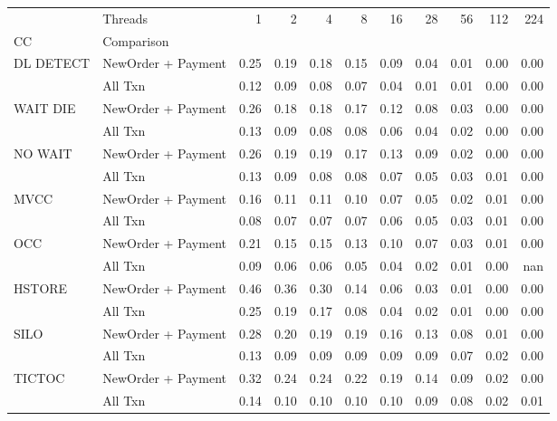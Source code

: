 \begin{tabular}{llrrrrrrrrr}
\toprule
       & Threads &  1   &  2   &  4   &  8   &  16  &  28  &  56  &  112 &  224 \\
CC & Comparison &      &      &      &      &      &      &      &      &      \\
\midrule
DL DETECT & NewOrder + Payment & 0.25 & 0.19 & 0.18 & 0.15 & 0.09 & 0.04 & 0.01 & 0.00 & 0.00 \\
       & All Txn & 0.12 & 0.09 & 0.08 & 0.07 & 0.04 & 0.01 & 0.01 & 0.00 & 0.00 \\
WAIT DIE & NewOrder + Payment & 0.26 & 0.18 & 0.18 & 0.17 & 0.12 & 0.08 & 0.03 & 0.00 & 0.00 \\
       & All Txn & 0.13 & 0.09 & 0.08 & 0.08 & 0.06 & 0.04 & 0.02 & 0.00 & 0.00 \\
NO WAIT & NewOrder + Payment & 0.26 & 0.19 & 0.19 & 0.17 & 0.13 & 0.09 & 0.02 & 0.00 & 0.00 \\
       & All Txn & 0.13 & 0.09 & 0.08 & 0.08 & 0.07 & 0.05 & 0.03 & 0.01 & 0.00 \\
MVCC & NewOrder + Payment & 0.16 & 0.11 & 0.11 & 0.10 & 0.07 & 0.05 & 0.02 & 0.01 & 0.00 \\
       & All Txn & 0.08 & 0.07 & 0.07 & 0.07 & 0.06 & 0.05 & 0.03 & 0.01 & 0.00 \\
OCC & NewOrder + Payment & 0.21 & 0.15 & 0.15 & 0.13 & 0.10 & 0.07 & 0.03 & 0.01 & 0.00 \\
       & All Txn & 0.09 & 0.06 & 0.06 & 0.05 & 0.04 & 0.02 & 0.01 & 0.00 &  nan \\
HSTORE & NewOrder + Payment & 0.46 & 0.36 & 0.30 & 0.14 & 0.06 & 0.03 & 0.01 & 0.00 & 0.00 \\
       & All Txn & 0.25 & 0.19 & 0.17 & 0.08 & 0.04 & 0.02 & 0.01 & 0.00 & 0.00 \\
SILO & NewOrder + Payment & 0.28 & 0.20 & 0.19 & 0.19 & 0.16 & 0.13 & 0.08 & 0.01 & 0.00 \\
       & All Txn & 0.13 & 0.09 & 0.09 & 0.09 & 0.09 & 0.09 & 0.07 & 0.02 & 0.00 \\
TICTOC & NewOrder + Payment & 0.32 & 0.24 & 0.24 & 0.22 & 0.19 & 0.14 & 0.09 & 0.02 & 0.00 \\
       & All Txn & 0.14 & 0.10 & 0.10 & 0.10 & 0.10 & 0.09 & 0.08 & 0.02 & 0.01 \\
\bottomrule
\end{tabular}
